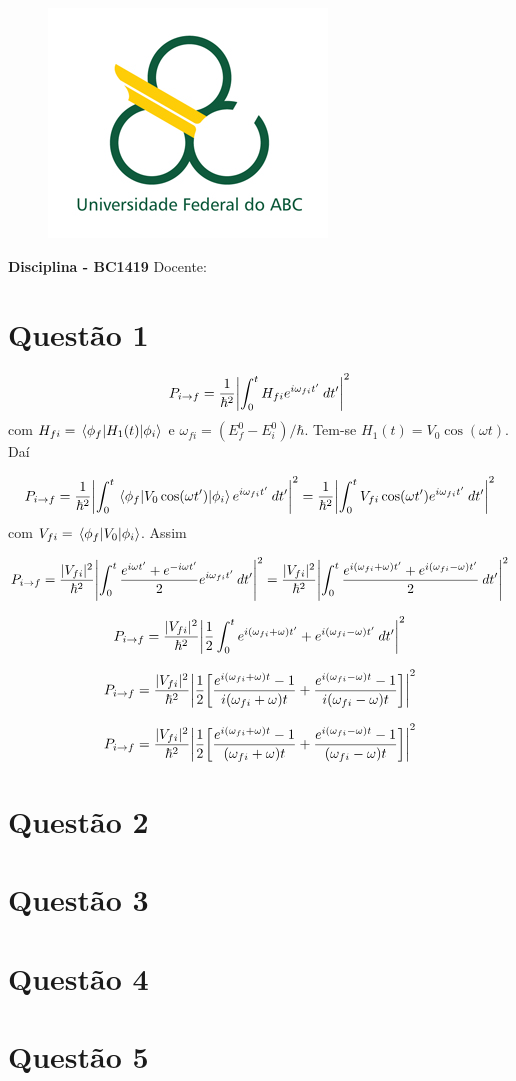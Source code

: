 \documentclass[report,12pt,openright,oneside,a4paper,brazil]{abntex2}
\date{Data}
\renewcommand{\imprimircapa}{%
\begin{capa}%
	\begin{figure}[ht]
		\centering
		\includegraphics[scale=0.6]{logo.jpg}
		\label{fig:logo}
	\end{figure}
	\begin{center}
		\textbf{\large Disciplina - BC1419}
		\vfill
    	{\LARGE\textbf{\imprimirtitulo}}
    	\vfill
    	Docente: \imprimirorientador
    	\vspace*{1cm}
		\imprimirautor
		\vfill
    	\imprimirlocal \\
    	\imprimirdata
	\end{center}
\end{capa}
}
\begin{document}
\imprimircapa


\chapter{Questão 1}

\begin{equation}
    P_{i \rightarrow f} = \frac{1}{\hbar^2}\qty|\int_0^t H_{fi} e^{i\omega_{fi}t'}\:dt'|^2
\end{equation}
com $H_{fi}=\mel{\phi_f}{H_1(t)}{\phi_i}$ e $\omega_{fi}=(E^0_f-E^0_i)/\hbar$. Tem-se $H_1(t)=V_0 \cos(\omega t)$. Daí

$$P_{i \rightarrow f} = \frac{1}{\hbar^2}\qty|\int_0^t \mel{\phi_f}{V_0 \cos(\omega t')}{\phi_i} e^{i\omega_{fi}t'}\:dt'|^2= \frac{1}{\hbar^2}\qty|\int_0^t V_{fi} \cos(\omega t') e^{i\omega_{fi}t'}\:dt'|^2$$
com $V_{fi}=\mel{\phi_f}{V_0}{\phi_i}$. Assim

$$P_{i \rightarrow f} = \frac{|V_{fi}|^2}{\hbar^2}\qty|\int_0^t \frac{e^{i\omega t'}+e^{-i\omega t'}}{2} e^{i\omega_{fi}t'}\:dt'|^2 = \frac{|V_{fi}|^2}{\hbar^2}\qty|\int_0^t \frac{e^{i(\omega_{fi}+\omega) t'}+e^{i(\omega_{fi}-\omega )t'}}{2}\:dt'|^2$$

$$P_{i \rightarrow f} = \frac{|V_{fi}|^2}{\hbar^2}\qty|\frac{1}{2}\int_0^t e^{i(\omega_{fi}+\omega) t'}+e^{i(\omega_{fi}-\omega )t'}\:dt'|^2$$

$$P_{i \rightarrow f} = \frac{|V_{fi}|^2}{\hbar^2}\qty|\frac{1}{2} \qty[\frac{e^{i(\omega_{fi}+\omega) t}-1}{i(\omega_{fi}+\omega)t}+\frac{e^{i(\omega_{fi}-\omega )t}-1}{i(\omega_{fi}-\omega)t}]|^2$$

$$P_{i \rightarrow f} = \frac{|V_{fi}|^2}{\hbar^2}\qty|\frac{1}{2} \qty[\frac{e^{i(\omega_{fi}+\omega) t}-1}{(\omega_{fi}+\omega)t}+\frac{e^{i(\omega_{fi}-\omega )t}-1}{(\omega_{fi}-\omega)t}]|^2$$


\chapter{Questão 2}

\chapter{Questão 3}

\chapter{Questão 4}

\chapter{Questão 5}
\end{document}
